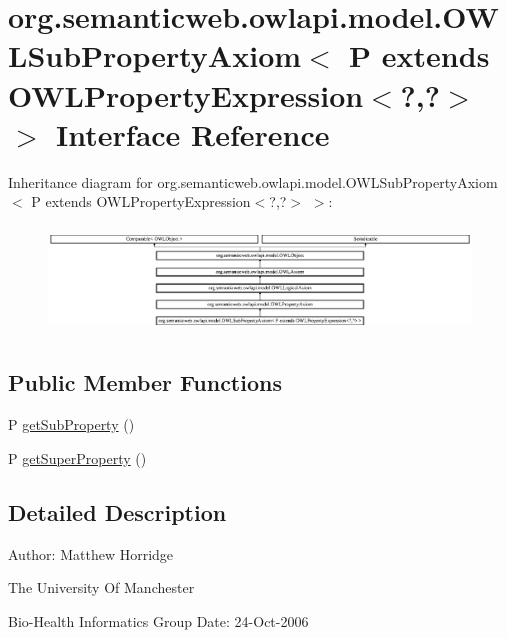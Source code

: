 \hypertarget{interfaceorg_1_1semanticweb_1_1owlapi_1_1model_1_1_o_w_l_sub_property_axiom_3_01_p_01extends_01_4e9c27ceb4f20c2d0b269e98d8cfdaa5}{\section{org.\-semanticweb.\-owlapi.\-model.\-O\-W\-L\-Sub\-Property\-Axiom$<$ P extends O\-W\-L\-Property\-Expression$<$?,?$>$ $>$ Interface Reference}
\label{interfaceorg_1_1semanticweb_1_1owlapi_1_1model_1_1_o_w_l_sub_property_axiom_3_01_p_01extends_01_4e9c27ceb4f20c2d0b269e98d8cfdaa5}
}
Inheritance diagram for org.\-semanticweb.\-owlapi.\-model.\-O\-W\-L\-Sub\-Property\-Axiom$<$ P extends O\-W\-L\-Property\-Expression$<$?,?$>$ $>$\-:\begin{figure}[H]
\begin{center}
\leavevmode
\includegraphics[height=2.871795cm]{interfaceorg_1_1semanticweb_1_1owlapi_1_1model_1_1_o_w_l_sub_property_axiom_3_01_p_01extends_01_4e9c27ceb4f20c2d0b269e98d8cfdaa5}
\end{center}
\end{figure}
\subsection*{Public Member Functions}
\begin{DoxyCompactItemize}
\item 
P \hyperlink{interfaceorg_1_1semanticweb_1_1owlapi_1_1model_1_1_o_w_l_sub_property_axiom_3_01_p_01extends_01_4e9c27ceb4f20c2d0b269e98d8cfdaa5_adeb9ba5e7621f7fc28653b52229b2cb0}{get\-Sub\-Property} ()
\item 
P \hyperlink{interfaceorg_1_1semanticweb_1_1owlapi_1_1model_1_1_o_w_l_sub_property_axiom_3_01_p_01extends_01_4e9c27ceb4f20c2d0b269e98d8cfdaa5_ab538875d7e815bbf0eb73ddb15a43229}{get\-Super\-Property} ()
\end{DoxyCompactItemize}


\subsection{Detailed Description}
Author\-: Matthew Horridge\par
 The University Of Manchester\par
 Bio-\/\-Health Informatics Group Date\-: 24-\/\-Oct-\/2006


